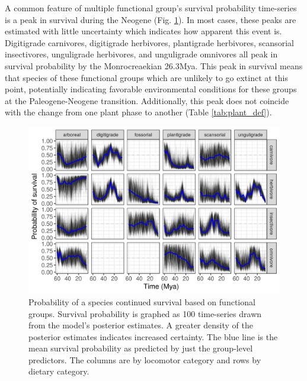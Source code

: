 \documentclass[12pt,letterpaper]{article}
\begin{document}
A common feature of multiple functional group's survival probability time-series is a peak in survival during the Neogene (Fig. \ref{fig:eco_survival}). In most cases, these peaks are estimated with little uncertainty which indicates how apparent this event is. Digitigrade carnivores, digitigrade herbivores, plantigrade herbivores, scansorial insectivores, unguligrade herbivores, and unguligrade omnivores all peak in survival probability by the Monrocreaekian 26.3Mya. This peak in survival means that species of these functional groups which are unlikely to go extinct at this point, potentially indicating favorable environmental conditions for these groups at the Paleogene-Neogene transition. Additionally, this peak does not coincide with the change from one plant phase to another (Table \ref{tab:plant_def}). 
\begin{figure}[ht]
  \centering
  \includegraphics[width=\textwidth,height=0.4\textheight,keepaspectratio=true]{figure/ecotype_survival_bd}
  \caption{Probability of a species continued survival based on functional groups. Survival probability is graphed as 100 time-series drawn from the model's posterior estimates. A greater density of the posterior estimates indicates increased certainty. The blue line is the mean survival probability as predicted by just the group-level predictors. The columns are by locomotor category and rows by dietary category.}
  \label{fig:eco_survival}
\end{figure}
\end{document}
